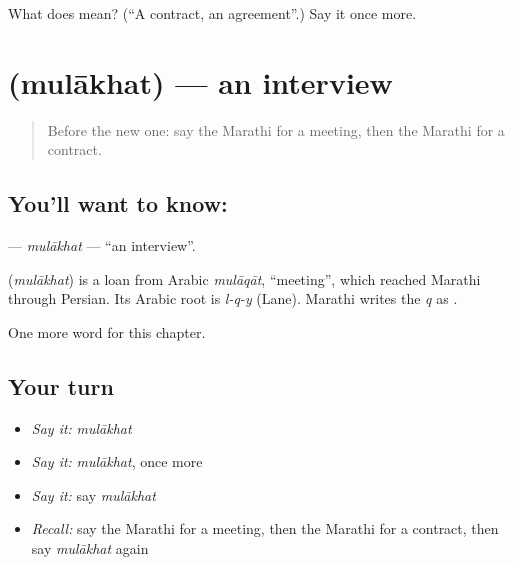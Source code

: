 \begin{tcolorbox}[breakable,colback=teal!4,colframe=teal!35!black,title={Before you move on}]
What does  mean? (\textquotedblleft{}A contract, an agreement\textquotedblright{}.) Say it once more.
\end{tcolorbox}
\section[\texorpdfstring{\mr{मुलाखत} (mulākhat)}{मुलाखत (mulākhat)}]{ (mulākhat) — an interview}

\label{lesson:MR-C192-mulakhat}



\begin{quote}
Before the new one: say the Marathi for a meeting, then the Marathi for a contract.
\end{quote}

\subsection*{You'll want to know: }
\textbf{} — \emph{mulākhat} — \textquotedblleft{}an interview\textquotedblright{}.

\begin{cousinweb}
\textbf{} (\emph{mulākhat}) is a loan from Arabic \emph{mulāqāt}, \textquotedblleft{}meeting\textquotedblright{}, which reached Marathi through Persian. Its Arabic root is \emph{l-q-y} (Lane). Marathi writes the \emph{q} as \textbf{}.
\end{cousinweb}

\begin{grammarlens}[title={What you've built}]
One more word for this chapter.
\end{grammarlens}

\subsection*{Your turn}
\begin{itemize}
\raggedright
  \item \emph{Say it:} \emph{mulākhat}
  \item \emph{Say it:} \emph{mulākhat}, once more
  \item \emph{Say it:} say \emph{mulākhat}
  \item \emph{Recall:} say the Marathi for a meeting, then the Marathi for a contract, then say \emph{mulākhat} again
\end{itemize}

